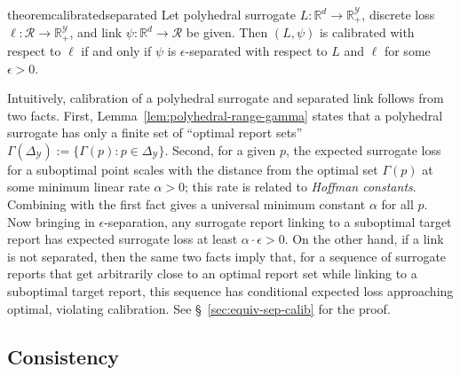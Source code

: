 \documentclass[twoside,11pt]{article}
\newcommand{\restatehack}[1]{}   %
\newcommand{\reals}{\mathbb{R}}
\newcommand{\simplex}{\Delta_\Y}
\newcommand{\R}{\mathcal{R}}
\newcommand{\Y}{\mathcal{Y}}
\begin{document}
\begin{restatable}{theorem}{calibratedseparated} \label{thm:calibrated-separated}
  Let polyhedral surrogate $L:\reals^d \to \reals^\Y_+$, discrete loss $\ell:\R\to\reals^\Y_+$, and link $\psi:\reals^d\to\R$ be given.
  Then $(L,\psi)$ is calibrated with respect to $\ell$ if and only if
  $\psi$ is $\epsilon$-separated with respect to $L$ and $\ell$ for some
  $\epsilon>0$.
\end{restatable}
Intuitively, calibration of a polyhedral surrogate and separated link follows from two facts.
First, Lemma~\ref{lem:polyhedral-range-gamma} states that a polyhedral surrogate has only a finite set of ``optimal report sets'' $\Gamma(\simplex) := \{\Gamma(p) : p \in \simplex\}$.
Second, for a given $p$, the expected surrogate loss for a suboptimal point scales with the distance from the optimal set $\Gamma(p)$ at some minimum linear rate $\alpha > 0$; this rate is related to \emph{Hoffman constants}.
Combining with the first fact gives a universal minimum constant $\alpha$ for all $p$.
Now bringing in $\epsilon$-separation, any surrogate report linking to a suboptimal target report has expected surrogate loss at least $\alpha \cdot \epsilon > 0$.
On the other hand, if a link is not separated, then the same two facts imply that, for a sequence of surrogate reports that get arbitrarily close to an optimal report set while linking to a suboptimal target report, this sequence has conditional expected loss approaching optimal, violating calibration.
See \S~\ref{sec:equiv-sep-calib} for the proof.

\subsection{Consistency}

\restatehack{
  \begin{theorem}
    \label{thm:calibrated-separated}
    \label{thm:thickened-separated}
  \end{theorem}}
\end{document}
